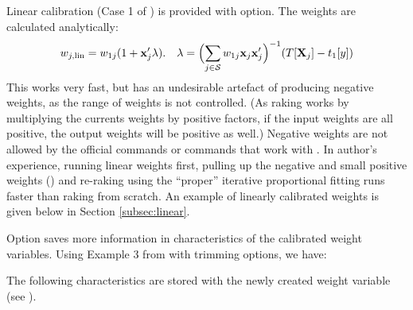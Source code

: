 Linear calibration (Case 1 of \citet{deville:sarndal:1992}) is provided with
 option. The weights are calculated analytically:
\begin{equation}
    \label{eq:linear:weight}
    w_{j,\rm{lin}} = w_{1j} (1+\mathbf{x}_j'\mathbf{\lambda}).
    \quad
    \mathbf{\lambda} = \Bigl( \sum_{j \in \mathcal{S}} w_{1j} \mathbf{x}_j \mathbf{x}_j' \Bigr)^{-1}
        ( T [ \mathbf{X}_j  ] - t_{1}[y] )
\end{equation}
This works very fast, but has an undesirable artefact of producing negative weights,
as the range of weights is not controlled. (As raking works by multiplying the currents
weights by positive factors, if the input weights are all positive, the output weights
will be positive as well.) Negative weights are not allowed by the official  commands
or commands that work with \stcmd{[pweights]}.
In author's experience, running linear weights first,
pulling up the negative and small positive weights ()
and re-raking using the ``proper'' iterative proportional fitting runs faster than
raking from scratch. An example of linearly calibrated weights is given below
in Section \ref{subsec:linear}.

Option  saves more information in characteristics of the calibrated
weight variables. Using Example 3 from \citet{kolenikov:2014} with trimming options,
we have:

\begin{stlog}
\nullskip
\end{stlog}

The following characteristics are stored with the newly created weight variable
(see ).


